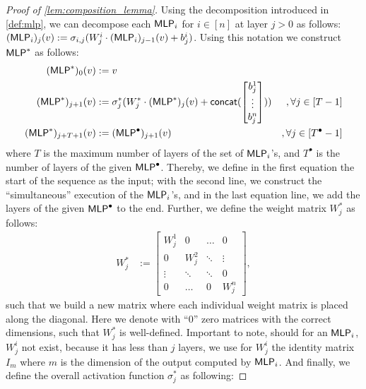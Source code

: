 \begin{proof}[Proof of \cref{lem:composition_lemma}]
   Using the decomposition introduced in \cref{def:mlp}, we can decompose each $\textsf{MLP}_i$ for $i \in [n]$ at layer $j > 0$ as follows: $(\textsf{MLP}_i)_{j}(v) := \sigma_{i,j}(W^{i}_{j} \cdot (\textsf{MLP}_i)_{j-1}(v) + b^i_j)$. Using this notation we construct $\textsf{MLP}^*$ as follows:
    \begin{align*}
        (\textsf{MLP}^*)_{0}(v) &:= v\\
        (\textsf{MLP}^*)_{j+1}(v) &:= \sigma^*_j(W^*_j \cdot (\textsf{MLP}^*)_{j} (v) + \textsf{concat}(
            \begin{bmatrix}
                b^1_j\\
                \vdots\\
                b^n_j
            \end{bmatrix})) &,\forall j \in [T-1]\\
        (\textsf{MLP}^*)_{j+T+1}(v) &:= (\textsf{MLP}^\bullet)_{j+1}(v) &,\forall j \in [T^\bullet - 1]
    \end{align*}
    where $T$ is the maximum number of layers of the set of $\textsf{MLP}_i$'s, and $T^\bullet$ is the number of layers of the given $\textsf{MLP}^\bullet$. Thereby, we define in the first equation the start of the sequence as the input; with the second line, we construct the ``simultaneous'' execution of the $\textsf{MLP}_i$'s, and in the last equation line, we add the layers of the given $\textsf{MLP}^\bullet$ to the end. Further, we define the weight matrix $W_j^*$ as follows: 
    \begin{align*}
        W^*_j &:= \begin{bmatrix}
            W^1_j & 0 & \hdots & 0\\
            0 & W^2_j & \ddots & \vdots\\
            \vdots & \ddots & \ddots & 0\\
            0 & \hdots & 0 & W^n_j
        \end{bmatrix},
    \end{align*}
    such that we build a new matrix where each individual weight matrix is placed along the diagonal. Here we denote with ``$0$'' zero matrices with the correct dimensions, such that $W_j^*$ is well-defined. Important to note, should for an $\textsf{MLP}_i$, $W^i_j$ not exist, because it has less than $j$ layers, we use for $W^i_j$ the identity matrix $I_m$ where $m$ is the dimension of the output computed by $\textsf{MLP}_i$. And finally, we define the overall activation function $\sigma^*_j$ as following:


 


\end{proof}
